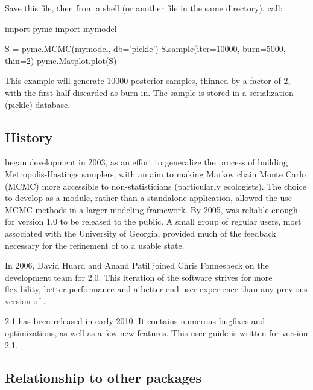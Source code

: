 \documentclass[]{jss}
\begin{document}
Save this file, then from a  shell (or another file in the same directory), call:
\begin{CodeInput}
import pymc
import mymodel
 
S = pymc.MCMC(mymodel, db='pickle')
S.sample(iter=10000, burn=5000, thin=2)
pymc.Matplot.plot(S)    
\end{CodeInput}

This example will generate 10000 posterior samples, thinned by a factor of 2, with the first half discarded as burn-in. The sample is stored in a  serialization (pickle) database.



\subsection{History}
  \label{history}


 began development in 2003, as an effort to generalize the process of building Metropolis-Hastings samplers, with an aim to making Markov chain Monte Carlo (MCMC) more accessible to non-statisticians (particularly ecologists). The choice to develop  as a  module, rather than a standalone application, allowed the use MCMC methods in a larger modeling framework. By 2005,  was reliable enough for version 1.0 to be released to the public. A small group of regular users, most associated with the University of Georgia, provided much of the feedback necessary for the refinement of  to a usable state.

In 2006, David Huard and Anand Patil joined Chris Fonnesbeck on the development team for  2.0. This iteration of the software strives for more flexibility, better performance and a better end-user experience than any previous version of .

 2.1 has been released in early 2010. It contains numerous bugfixes and optimizations, as well as a few new features. This user guide is written for version 2.1.



\subsection{Relationship to other packages}
  \label{relationship-to-other-packages}%
\end{document}

